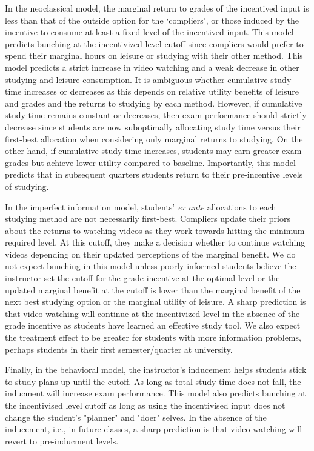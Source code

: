 \documentclass[12pt]{article}
\begin{document}
In the neoclassical model, the marginal return to grades of the incentived input is less than that of the outside option for the `compliers', or those induced by the incentive to consume at least a fixed level of the incentived input. This model predicts bunching at the incentivized level cutoff since compliers would prefer to spend their marginal hours on leisure or studying with their other method. This model predicts a strict increase in video watching and a weak decrease in other studying and leisure consumption. It is ambiguous whether cumulative study time increases or decreases as this depends on relative utility benefits of leisure and grades and the returns to studying by each method. However, if cumulative study time remains constant or decreases, then exam performance should strictly decrease since students are now suboptimally allocating study time versus their first-best allocation when considering only marginal returns to studying. On the other hand, if cumulative study time increases, students may earn greater exam grades but achieve lower utility compared to baseline. Importantly, this model predicts that in subsequent quarters students return to their pre-incentive levels of studying.

In the imperfect information model, students' \textit{ex ante} allocations to each studying method are not necessarily first-best. Compliers update their priors about the returns to watching videos as they work towards hitting the minimum required level. At this cutoff, they make a decision whether to continue watching videos depending on their updated perceptions of the marginal benefit. We do not expect bunching in this model unless poorly informed students believe the instructor set the cutoff for the grade incentive at the optimal level or the updated marginal benefit at the cutoff is lower than the marginal benefit of the next best studying option or the marginal utility of leisure.  A sharp prediction is that video watching will continue at the incentivized level in the absence of the grade incentive as students have learned an effective study tool. We also expect the treatment effect to be greater for students with more information problems, perhaps students in their first semester/quarter at university.

Finally, in the behavioral model, the instructor's inducement helps students stick to study plans up until the cutoff. As long as total study time does not fall, the inducment will increase exam performance. This model also predicts bunching at the incentivised level cutoff as long as using the incentivised input does not change the student's "planner" and "doer" selves.  In the absence of the inducement, i.e., in future classes, a sharp prediction is that video watching will revert to pre-inducment levels.
\end{document}
